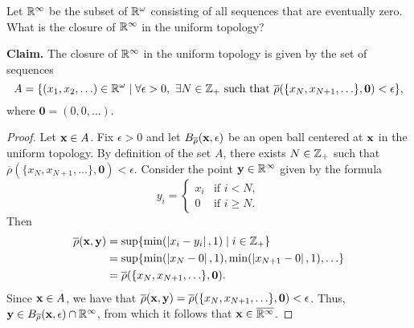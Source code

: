 \begin{exercise}[ID=2.20.5]
    Let $\mathbb{R}^\infty$ be the subset of $\mathbb{R}^\omega$ consisting of all sequences that are eventually zero.
    What is the closure of $\mathbb{R}^\infty$ in the uniform topology?
\end{exercise}
%
\begin{solution}
  \textbf{Claim.} The closure of $\mathbb{R}^\infty$ in the uniform topology is given by the set of sequences
  \begin{equation*}
    A = \{ (x_1, x_2, \ldots) \in \mathbb{R}^\omega \mid \forall \epsilon > 0,~ \exists N \in \mathbb{Z}_+ ~\textrm{such that}~ \overline{\rho}(\{ x_N, x_{N+1}, \ldots \}, \mathbf{0}) < \epsilon \},
  \end{equation*}
  where $\mathbf{0} = (0, 0, \ldots)$.
  \begin{proof}
    Let $\mathbf{x} \in A$.
    Fix $\epsilon > 0$ and let $B_{\overline{\rho}}(\mathbf{x}, \epsilon)$ be an open ball centered at $\mathbf{x}$ in the uniform topology.
    By definition of the set $A$, there exists $N \in \mathbb{Z}_+$ such that $\overline{\rho}(\{ x_N, x_{N+1}, \ldots \}, \mathbf{0}) < \epsilon$.
    Consider the point $\mathbf{y} \in \mathbb{R}^\infty$ given by the formula
    \begin{equation*}
        y_i =
        \begin{cases}
            x_i & \text{if } i < N, \\
            0   & \text{if } i \geq N.
        \end{cases}
    \end{equation*}
    Then
    \begin{align*}
      \overline{\rho}(\mathbf{x}, \mathbf{y}) &= \sup\{\min(\left| x_i - y_i \right|, 1) \mid i \in \mathbb{Z}_+\} \\
                                &= \sup\{\min(\left| x_N - 0 \right|, 1), \min(\left| x_{N+1} - 0 \right|, 1), \ldots\} \\
                                &= \overline{\rho}(\{ x_N, x_{N+1}, \ldots \}, \mathbf{0}).
    \end{align*}
    Since $\mathbf{x} \in A$, we have that $\overline{\rho}(\mathbf{x}, \mathbf{y}) = \overline{\rho}(\{ x_N, x_{N+1}, \ldots \}, \mathbf{0}) < \epsilon$.
    Thus, $\mathbf{y} \in B_{\overline{\rho}}(\mathbf{x}, \epsilon) \cap \mathbb{R}^\infty$, from which it follows that $\mathbf{x} \in \overline{\mathbb{R}^\infty}$.


\end{proof}
\end{solution}
